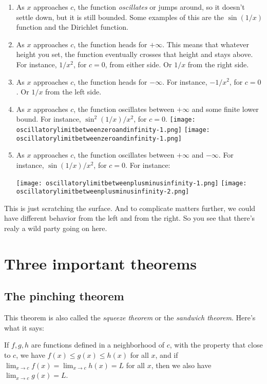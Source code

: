 \documentclass[10pt]{amsart}
\begin{document}
\begin{enumerate}
\item As $x$ approaches $c$, the function {\em oscillates} or jumps
  around, so it doesn't settle down, but it is still bounded. Some
  examples of this are the $\sin(1/x)$ function and the Dirichlet
  function.
\item As $x$ approaches $c$, the function heads for $+\infty$. This
  means that whatever height you set, the function eventually crosses
  that height and stays above. For instance, $1/x^2$, for $c = 0$,
  from either side. Or $1/x$ from the right side.
\item As $x$ approaches $c$, the function heads for $-\infty$. For
  instance, $-1/x^2$, for $c = 0$. Or $1/x$ from the left side.
\item As $x$ approaches $c$, the function oscillates between $+\infty$
  and some finite lower bound. For instance, $\sin^2(1/x)/x^2$, for $c
  = 0$.
  \texttt{[image: oscillatorylimitbetweenzeroandinfinity-1.png]}
  \texttt{[image: oscillatorylimitbetweenzeroandinfinity-1.png]}
\item As $x$ approaches $c$, the function oscillates between $+\infty$
  and $-\infty$. For instance, $\sin(1/x)/x^2$, for $c = 0$. For instance:

  \texttt{[image: oscillatorylimitbetweenplusminusinfinity-1.png]}
  \texttt{[image: oscillatorylimitbetweenplusminusinfinity-2.png]}
\end{enumerate}

This is just scratching the surface. And to complicate matters
further, we could have different behavior from the left and from the
right. So you see that there's realy a wild party going on here.

\section{Three important theorems}

\subsection{The pinching theorem}

This theorem is also called the {\em squeeze theorem} or the {\em
sandwich theorem}. Here's what it says:

If $f,g,h$ are functions defined in a neighborhood of $c$, with the
property that close to $c$, we have $f(x) \le g(x) \le h(x)$ for all
$x$, and if $\lim_{x \to c} f(x) = \lim_{x \to c} h(x) = L$ for all
$x$, then we also have $\lim_{x \to c} g(x) = L$.
\end{document}
